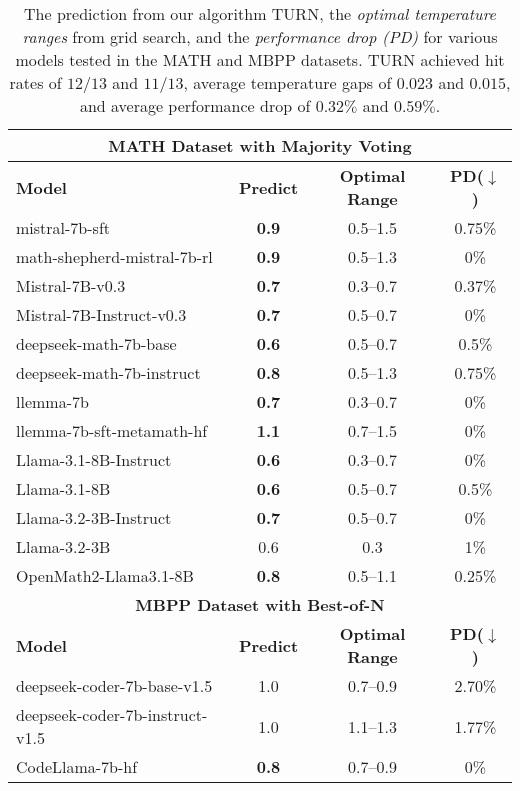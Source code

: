 \begin{table}[ht]
\vspace{-3mm}
\centering
\caption{The prediction from our algorithm \textsc{TURN}, the \emph{optimal temperature ranges} from grid search, and the \emph{performance drop (PD)} for various models tested in the MATH and MBPP datasets. \textsc{TURN} achieved hit rates of $12/13$ and $11/13$, average temperature gaps of \(0.023\) and \(0.015\), and average performance drop of $0.32\%$ and $0.59\%$.}
\centering
\label{table: hit rate}
\scriptsize
\begin{tabularx}{0.48\textwidth}{@{} l c c c @{}}
\toprule
\multicolumn{4}{c}{\textbf{MATH Dataset with Majority Voting}} \\
\midrule
\textbf{Model} & \textbf{Predict} & \textbf{Optimal Range} & \textbf{PD($\downarrow$)} \\
\midrule
mistral-7b-sft & \textbf{0.9} & 0.5--1.5 & 0.75\% \\
math-shepherd-mistral-7b-rl & \textbf{0.9} & 0.5--1.3 & 0\% \\
Mistral-7B-v0.3 & \textbf{0.7} & 0.3--0.7 & 0.37\% \\
Mistral-7B-Instruct-v0.3 & \textbf{0.7} & 0.5--0.7 & 0\% \\
deepseek-math-7b-base & \textbf{0.6} & 0.5--0.7 & 0.5\%\\
deepseek-math-7b-instruct & \textbf{0.8} & 0.5--1.3 & 0.75\% \\
llemma-7b & \textbf{0.7} & 0.3--0.7 & 0\%\\
llemma-7b-sft-metamath-hf & \textbf{1.1} & 0.7--1.5 & 0\%\\
Llama-3.1-8B-Instruct & \textbf{0.6} & 0.3--0.7 & 0\%\\
Llama-3.1-8B & \textbf{0.6} & 0.5--0.7 & 0.5\%\\
Llama-3.2-3B-Instruct & \textbf{0.7} & 0.5--0.7 & 0\%\\
Llama-3.2-3B & 0.6 & 0.3 & 1\%\\
OpenMath2-Llama3.1-8B & \textbf{0.8} & 0.5--1.1 & 0.25\%\\
\midrule
\multicolumn{4}{c}{\textbf{MBPP Dataset with Best-of-N}} \\
\midrule
\textbf{Model} & \textbf{Predict} & \textbf{Optimal Range} & \textbf{PD($\downarrow$)}\\
\midrule
deepseek-coder-7b-base-v1.5 & 1.0 & 0.7--0.9 & 2.70\%\\
deepseek-coder-7b-instruct-v1.5 & 1.0 & 1.1--1.3 & 1.77\% \\
CodeLlama-7b-hf & \textbf{0.8} & 0.7--0.9 & 0\%\\

\end{tabularx}
\end{table}

